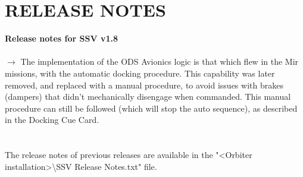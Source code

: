\documentclass[Space_Shuttle_Vessel_Manual.tex]{subfiles}
\begin{document}
\section{RELEASE NOTES}
\label{sec:release-notes}
\noindent
\textbf{Release notes for SSV v1.8}\\\\
$\rightarrow$ The implementation of the ODS Avionics logic is that which flew in the Mir missions, with the automatic docking procedure. This capability was later removed, and replaced with a manual procedure, to avoid issues with brakes (dampers) that didn't mechanically disengage when commanded. This manual procedure can still be followed (which will stop the auto sequence), as described in the Docking Cue Card.\\
\\
\\
The release notes of previous releases are available in the "<Orbiter installation>\textbackslash SSV Release Notes.txt" file.
\end{document}
